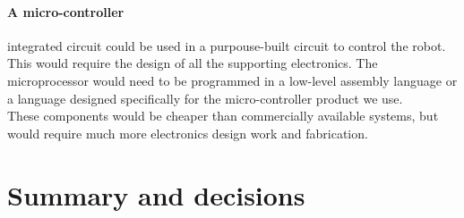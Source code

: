     \paragraph{A micro-controller} integrated circuit could be used in a purpouse-built circuit to control the robot. This would require the design of all the supporting electronics. The microprocessor would need to be programmed in a low-level assembly language or a language designed specifically for the micro-controller product we use.\\
    These components would be cheaper than commercially available systems, but would require much more electronics design work and fabrication.


\section{Summary and decisions}


